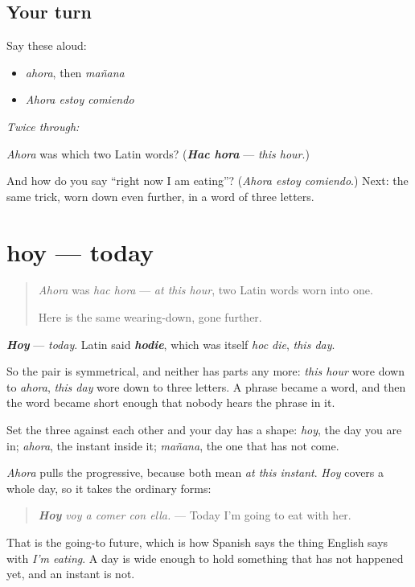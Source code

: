 \subsection*{Your turn}
Say these aloud:

\begin{itemize}
\raggedright
  \item \emph{ahora}, then \emph{mañana}
  \item \emph{Ahora estoy comiendo}
\end{itemize}

\emph{Twice through:}

\begin{tcolorbox}[breakable,colback=teal!4,colframe=teal!35!black,title={Before you move on}]
\emph{Ahora} was which two Latin words? (\emph{\textbf{Hac hora}} — \emph{this hour}.)

And how do you say \textquotedblleft{}right now I am eating\textquotedblright{}? (\emph{Ahora estoy comiendo}.) Next: the same trick, worn down even further, in a word of three letters.
\end{tcolorbox}
\section[hoy]{hoy — today}

\label{lesson:ES-C65-hoy}



\begin{quote}
\emph{Ahora} was \emph{hac hora} — \emph{at this hour}, two Latin words worn into one.

Here is the same wearing-down, gone further.
\end{quote}

\begin{cousinweb}
\emph{\textbf{Hoy}} — \emph{today}. Latin said \emph{\textbf{hodie}}, which was itself \emph{hoc die}, \emph{this day}.

So the pair is symmetrical, and neither has parts any more: \emph{this hour} wore down to \emph{ahora}, \emph{this day} wore down to three letters. A phrase became a word, and then the word became short enough that nobody hears the phrase in it.

Set the three against each other and your day has a shape: \emph{hoy}, the day you are in; \emph{ahora}, the instant inside it; \emph{mañana}, the one that has not come.
\end{cousinweb}

\begin{culture}
\emph{Ahora} pulls the progressive, because both mean \emph{at this instant}. \emph{Hoy} covers a whole day, so it takes the ordinary forms:

\begin{quote}
\emph{\textbf{Hoy}} \emph{voy a comer con ella.} — Today I'm going to eat with her.
\end{quote}

That is the going-to future, which is how Spanish says the thing English says with \emph{I'm eating}. A day is wide enough to hold something that has not happened yet, and an instant is not.
\end{culture}

